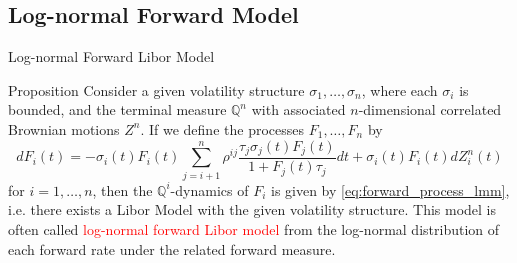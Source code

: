 \documentclass{beamer}
\begin{document}
\subsection{Log-normal Forward Model}
\begin{frame}{Log-normal Forward Libor Model}
  \begin{block}{Proposition}
    Consider a given volatility structure $\sigma_1,\ldots, \sigma_n$, where each $\sigma_i$ is bounded, and the terminal measure $\mathbb{Q}^n$ with associated $n$-dimensional correlated Brownian motions $Z^n$. If we define the processes $F_1,\ldots, F_n$ by
    \begin{equation}
      dF_i(t) = -\sigma_i(t)F_i(t)\sum_{j=i+1}^n \rho^{ij} \frac{\tau_j\sigma_j(t)F_j(t)}{1+F_j(t)\tau_j} dt + \sigma_i(t)F_i(t)dZ^n_i(t)
    \end{equation}
    for $i = 1,\ldots, n$, then the $\mathbb{Q}^i$-dynamics of $F_i$ is given by \cref{eq:forward_process_lmm}, i.e. there exists a Libor Model with the given volatility structure.
  This model is often called \textcolor{red}{log-normal forward Libor model} from the log-normal distribution of each forward rate under the related forward measure.
  \end{block}
\end{frame}

\end{document}

